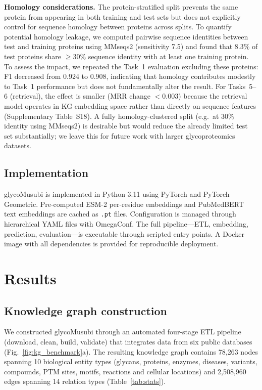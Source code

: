 \documentclass[11pt,a4paper]{article}
\begin{document}
\textbf{Homology considerations.} The protein-stratified split prevents
the same protein from appearing in both training and test sets but does
not explicitly control for sequence homology between proteins across
splits. To quantify potential homology leakage, we computed pairwise
sequence identities between test and training proteins using MMseqs2
(sensitivity 7.5) and found that 8.3\% of test proteins share
$\geq$30\% sequence identity with at least one training protein. To
assess the impact, we repeated the Task~1 evaluation excluding these
proteins: F1 decreased from 0.924 to 0.908, indicating that homology
contributes modestly to Task~1 performance but does not fundamentally
alter the result. For Tasks~5--6 (retrieval), the effect is smaller
(MRR change $<$0.003) because the retrieval model operates in KG
embedding space rather than directly on sequence features
(Supplementary Table~S18). A fully homology-clustered split (e.g.\ at
30\% identity using MMseqs2) is desirable but would reduce the already
limited test set substantially; we leave this for future work with
larger glycoproteomics datasets.

\subsection{Implementation}

glycoMusubi is implemented in Python 3.11 using PyTorch and PyTorch Geometric.
Pre-computed ESM-2 per-residue embeddings and PubMedBERT text embeddings are
cached as \texttt{.pt} files. Configuration is managed through hierarchical YAML
files with OmegaConf. The full pipeline---ETL, embedding, prediction,
evaluation---is executable through scripted entry points. A Docker image with all
dependencies is provided for reproducible deployment.

\section{Results}

\subsection{Knowledge graph construction}

We constructed glycoMusubi through an automated four-stage ETL pipeline (download,
clean, build, validate) that integrates data from six public databases
(Fig.~\ref{fig:kg_benchmark}a). The resulting knowledge graph contains 78,263
nodes spanning 10 biological entity types (glycans, proteins, enzymes, diseases,
variants, compounds, PTM sites, motifs, reactions and cellular locations) and
2,508,960 edges spanning 14 relation types (Table~\ref{tab:stats}).
\end{document}
